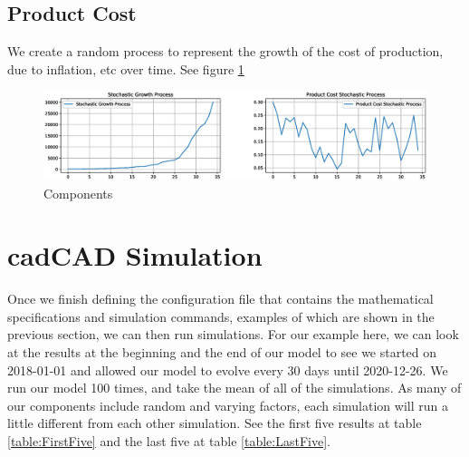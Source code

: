 \documentclass[12pt]{extarticle}
\begin{document}
\subsection{Product Cost}
We create a random process to represent the growth of the cost of production, due to inflation, etc over time. See figure \ref{fig:components}
\\
\begin{figure}[h]
    \centering
    \includegraphics[width=1\textwidth]{images/components.eps}
    \caption{Components}
    \label{fig:components}
\end{figure}
\newpage


\section{cadCAD Simulation}
Once we finish defining the configuration file that contains the mathematical specifications and simulation commands, examples of which are shown in the previous section, we can then run simulations.  For our example here, we can look at the results at the beginning and the end of our model to see we started on 2018-01-01 and allowed our model to evolve every 30 days until 2020-12-26. We run our model 100 times, and take the mean of all of the simulations. As many of our components include random and varying factors, each simulation will run a little different from each other simulation. See the first five results at table \ref{table:FirstFive} and the last five at table \ref{table:LastFive}. \\ 
\end{document}
